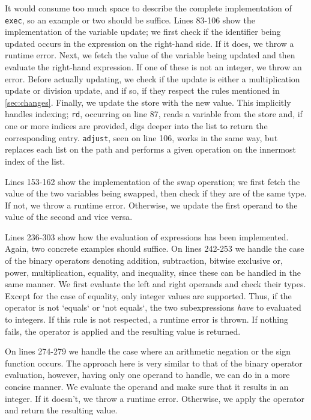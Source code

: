 It would consume too much space to describe the complete implementation of \texttt{exec}, so an example or two should be suffice. Lines 83-106 show the implementation of the variable update; we first check if the identifier being updated occurs in the expression on the right-hand side. If it does, we throw a runtime error. Next, we fetch the value of the variable being updated and then evaluate the right-hand expression. If one of these is not an integer, we throw an error. Before actually updating, we check if the update is either a multiplication update or division update, and if so, if they respect the rules mentioned in \ref{sec:changes}. Finally, we update the store with the new value. This implicitly handles indexing; \texttt{rd}, occurring on line 87, reads a variable from the store and, if one or more indices are provided, digs deeper into the list to return the corresponding entry. \texttt{adjust}, seen on line 106, works in the same way, but replaces each list on the path and performs a given operation on the innermost index of the list.

Lines 153-162 show the implementation of the swap operation; we first fetch the value of the two variables being swapped, then check if they are of the same type. If not, we throw a runtime error. Otherwise, we update the first operand to the value of the second and vice versa.

Lines 236-303 show how the evaluation of expressions has been implemented. Again, two concrete examples should suffice. On lines 242-253 we handle the case of the binary operators denoting addition, subtraction, bitwise exclusive or, power, multiplication, equality, and inequality, since these can be handled in the same manner. We first evaluate the left and right operands and check their types. Except for the case of equality, only integer values are supported. Thus, if the operator is not `equals` or `not equals`, the two subexpressions \textit{have} to evaluated to integers. If this rule is not respected, a runtime error is thrown. If nothing fails, the operator is applied and the resulting value is returned.

On lines 274-279 we handle the case where an arithmetic negation or the sign function occurs. The approach here is very similar to that of the binary operator evaluation, however, having only one operand to handle, we can do in a more concise manner. We evaluate the operand and make sure that it results in an integer. If it doesn't, we throw a runtime error. Otherwise, we apply the operator and return the resulting value.

